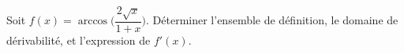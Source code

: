 
\begin{exercice}\label{exostarterST-0014modif}

Soit $f(x) = \arccos\Big( \dfrac{2\sqrt{x}}{1+x}\Big)$. Déterminer l'ensemble de définition, le domaine de dérivabilité, et l'expression de $f'(x)$.


\end{exercice}
